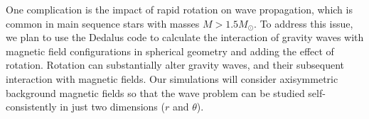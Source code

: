 One complication is the impact of rapid rotation on wave propagation, which is common in main sequence stars with masses $M > 1.5M_\odot$. To address this issue, we plan to use the Dedalus code to calculate the interaction of gravity waves with  magnetic field configurations in spherical geometry \citep[e.g.][]{Braithwaite_2006} and adding the effect of rotation. Rotation can substantially alter gravity waves, and their subsequent interaction with magnetic fields. Our simulations will consider axisymmetric background magnetic fields so that the wave problem can be studied self-consistently in just two dimensions ($r$ and $\theta$). 